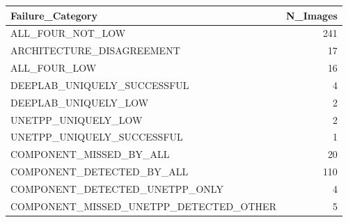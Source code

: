 \begin{tabular}{lr}
\toprule
Failure_Category & N_Images \\
\midrule
ALL_FOUR_NOT_LOW & 241 \\
ARCHITECTURE_DISAGREEMENT & 17 \\
ALL_FOUR_LOW & 16 \\
DEEPLAB_UNIQUELY_SUCCESSFUL & 4 \\
DEEPLAB_UNIQUELY_LOW & 2 \\
UNETPP_UNIQUELY_LOW & 2 \\
UNETPP_UNIQUELY_SUCCESSFUL & 1 \\
COMPONENT_MISSED_BY_ALL & 20 \\
COMPONENT_DETECTED_BY_ALL & 110 \\
COMPONENT_DETECTED_UNETPP_ONLY & 4 \\
COMPONENT_MISSED_UNETPP_DETECTED_OTHER & 5 \\
\bottomrule
\end{tabular}
